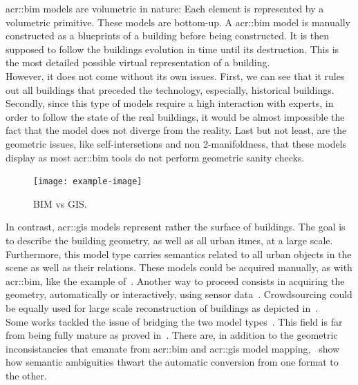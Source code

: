             \gls{acr::bim} models are volumetric in nature:
            Each element is represented by a volumetric primitive.
            These models are bottom-up.
            A \gls{acr::bim} model is manually constructed as a blueprints of a building before being constructed.
            It is then supposed to follow the buildings evolution in time until its destruction.
            This is the most detailed possible virtual representation of a building.\\
            However, it does not come without its own issues.
            First, we can see that it rules out all buildings that preceded the technology, especially, historical buildings.
            Secondly, since this type of models require a high interaction with experts, in order to follow the state of the real buildings, it would be almost impossible the fact that the model does not diverge from the reality\addref.
            Last but not least, are the geometric issues, like self-intersetions and non 2-manifoldness, that these models display as most \gls{acr::bim} tools do not perform geometric sanity checks.\\

            \begin{figure}[htpb]
                \centering
                \texttt{[image: example-image]}            
                \caption{
                    \label{fig::bim_vs_gis} BIM vs GIS.
                }
            \end{figure}

            In contrast, \gls{acr::gis} models represent rather the surface of buildings.
            The goal is to describe the building geometry, as well as all urban itmes, at a large scale.
            Furthermore, this model type carries semantics related to all urban objects in the scene as well as their relations.
            These models could be acquired manually, as with \gls{acr::bim}, like the example of~\textcite{ref3dnat}.
            Another way to proceed consists in acquiring the geometry, automatically or interactively, using sensor data~\parencite{musialski2013survey}.
            Crowdsourcing could be equally used for large scale reconstruction of buildings as depicted in~\textcite{uden2013open}.\\

            Some works tackled the issue of bridging the two model types~\parencite{deng2016mapping}.
            This field is far from being fully mature as proved in~\textcite{stoter2018geo}.
            There are, in addition to the geometric inconsistancies that emanate from \gls{acr::bim} and \gls{acr::gis} model mapping,~\textcite{stoter2018geo} show how semantic ambiguities thwart the automatic conversion from one format to the other.\\

